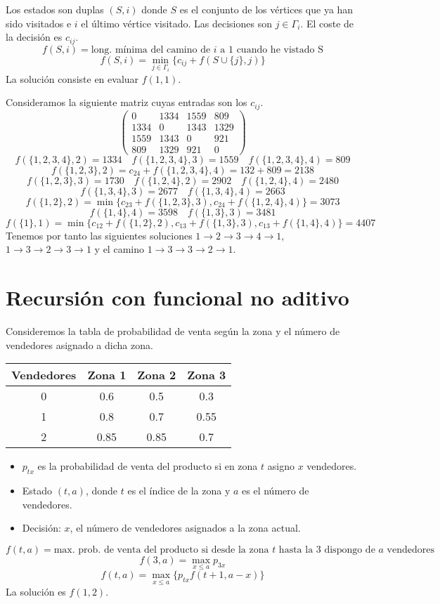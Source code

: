 \documentclass[MIOP.tex]{subfiles}
\begin{document}
Los estados son duplas $(S,i)$ donde $S$ es el conjunto de los vértices que ya han sido visitados e $i$ el último vértice visitado. Las decisiones son $j\in\Gamma_i$. El coste de la decisión es $c_{ij}$.
$$
f(S,i)= \text{long. mínima del camino de $i$ a 1 cuando he vistado S}
$$
$$f(S,i) = \min_{j\in\Gamma_i}\{c_{ij}+f(S\cup\{j\},j)\}
$$
La solución consiste en evaluar $f(1,1)$. 
\begin{ej} Consideramos la siguiente matriz cuyas entradas son los $c_{ij}$.
$$
\begin{pmatrix}
0 & 1334 & 1559 & 809\\
1334 & 0 & 1343 & 1329\\
1559 & 1343 & 0 &  921\\
809& 1329& 921 & 0
\end{pmatrix}
$$
$$
f(\{1,2,3,4\},2) = 1334 \quad f(\{1,2,3,4\},3) = 1559 \quad f(\{1,2,3,4\},4) = 809
$$
$$
f(\{1,2,3\},2) = c_{24}+ f(\{1,2,3,4\},4) = 132+809=2138
$$
$$
f(\{1,2,3\},3) = 1730 \quad f(\{1,2,4\},2) = 2902 \quad f(\{1,2,4\},4) = 2480
$$
$$
f(\{1,3,4\},3) = 2677 \quad f(\{1,3,4\},4)=2663
 $$
 $$
 f(\{1,2\},2) = \min\{c_{23}+f(\{1,2,3\},3), c_{24}+f(\{1,2,4\},4)\} = 3073
 $$
 $$
 f(\{1,4\},4) = 3598 \quad f(\{1,3\},3) = 3481
 $$
 $$
 f(\{1\},1) = \min\{c_{12}+f(\{1,2\},2), c_{13}+f(\{1,3\},3), c_{13}+f(\{1,4\},4)\} = 4407
 $$
Tenemos por tanto las siguientes soluciones $1\to 2 \to 3 \to 4 \to 1$, $1\to 3 \to 2 \to 3 \to 1$ y el camino $ 1 \to 3 \to 3 \to 2 \to 1$.
\end{ej}
\section{Recursión con funcional no aditivo}
Consideremos la tabla de probabilidad de venta según la zona y el número de vendedores asignado a dicha zona.

\begin{center}
\begin{tabular}{|c|c|c|c|}
\hline
Vendedores & Zona 1 & Zona 2 & Zona 3\\
\hline
0 & 0.6 & 0.5 & 0.3\\
\hline
1 & 0.8 & 0.7 & 0.55\\
\hline
2 & 0.85 & 0.85 & 0.7\\
\hline
\end{tabular}
\end{center}
\begin{itemize}
\item $p_{tx}$ es la probabilidad de venta del producto si en zona $t$ asigno $x$ vendedores.
\item Estado $(t,a)$, donde $t$ es el índice de la zona y $a$ es el número de vendedores.
\item Decisión: $x$, el número de vendedores asignados a la zona actual.
\end{itemize}
$$f(t,a)=\text{max. prob. de venta del producto si desde la zona $t$ hasta la 3 dispongo de $a$ vendedores}.
$$
$$f(3,a)=\max_{x\leq a} p_{3x}
$$
$$f(t,a) = \max_{x\leq a}\{p_{tx} f(t+1,a-x)\}$$
La solución es $f(1,2)$.
\end{document}
